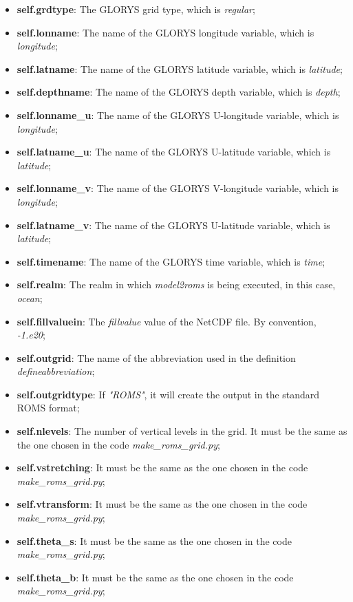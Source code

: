 \begin{itemize}
    \item \textbf{self.grdtype}: The GLORYS grid type, which is \textit{regular};
    \item \textbf{self.lonname}: The name of the GLORYS longitude variable, which is \textit{longitude};
    \item \textbf{self.latname}: The name of the GLORYS latitude variable, which is \textit{latitude};
    \item \textbf{self.depthname}: The name of the GLORYS depth variable, which is \textit{depth};
    \item \textbf{self.lonname\_u}: The name of the GLORYS U-longitude variable, which is \textit{longitude};
    \item \textbf{self.latname\_u}: The name of the GLORYS U-latitude variable, which is \textit{latitude};
    \item \textbf{self.lonname\_v}: The name of the GLORYS V-longitude variable, which is \textit{longitude};
    \item \textbf{self.latname\_v}: The name of the GLORYS U-latitude variable, which is \textit{latitude};
    \item \textbf{self.timename}: The name of the GLORYS time variable, which is \textit{time};
    \item \textbf{self.realm}: The realm in which \textit{model2roms} is being executed, in this case, \textit{ocean};
    \item \textbf{self.fillvaluein}: The \textit{fillvalue} value of the NetCDF file. By convention, \textit{-1.e20};
    \item \textbf{self.outgrid}: The name of the abbreviation used in the definition \textit{defineabbreviation};
    \item \textbf{self.outgridtype}: If \textit{"ROMS"}, it will create the output in the standard ROMS format;
    \item \textbf{self.nlevels}: The number of vertical levels in the grid. It must be the same as the one chosen in the code \textit{make\_roms\_grid.py};
    \item \textbf{self.vstretching}: It must be the same as the one chosen in the code \textit{make\_roms\_grid.py};
    \item \textbf{self.vtransform}: It must be the same as the one chosen in the code \textit{make\_roms\_grid.py};
    \item \textbf{self.theta\_s}: It must be the same as the one chosen in the code \textit{make\_roms\_grid.py};
    \item \textbf{self.theta\_b}: It must be the same as the one chosen in the code \textit{make\_roms\_grid.py};

\end{itemize}
